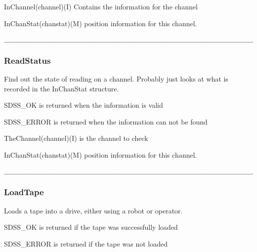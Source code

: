 \begin{arguments}
\item{InChannel}(channel)(I) Contains the information for the channel
\item{InChanStat}(chanstat)(M) position information for this channel.
\end{arguments}
\begin{verbatim}
__________________________________________________________________________
\end{verbatim}
\subsubsection{ReadStatus}

\begin{descrip}
Find out the state of reading on a channel.  Probably just looks
at what is recorded in the InChanStat structure.  
\end{descrip}

\begin{returnval}
\item{SDSS\_OK} is returned when the information is valid
\item{SDSS\_ERROR} is returned when the information can not be found
\end{returnval}

\begin{arguments}
\item{TheChannel}(channel)(I) is the channel to check
\item{InChanStat}(chanstat)(M) position information for this channel.
\end{arguments}

\begin{verbatim}
__________________________________________________________________________
\end{verbatim}

\subsubsection{LoadTape}

\begin{descrip}
Loads a tape into a drive, either using a robot or operator.
\end{descrip}

\begin{returnval}
\item{SDSS\_OK} is returned if the tape was successfully loaded
\item{SDSS\_ERROR} is returned if the tape was not loaded
\end{returnval}

